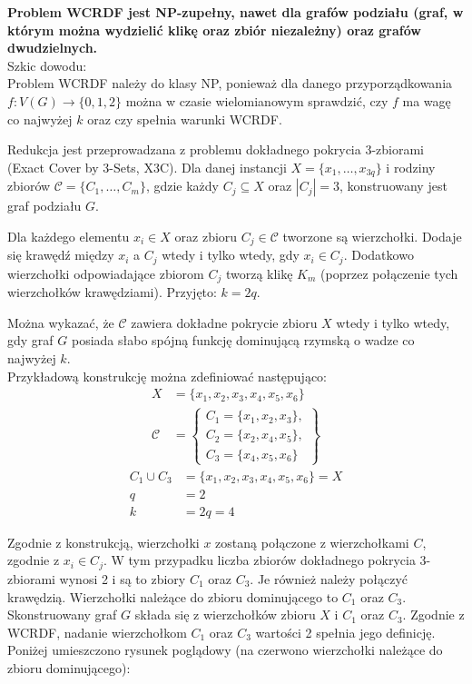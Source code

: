 \textbf{Problem WCRDF jest NP-zupełny, nawet dla grafów podziału (graf, w którym można wydzielić klikę oraz zbiór niezależny) oraz grafów dwudzielnych.}\\

Szkic dowodu:\\
Problem WCRDF należy do klasy NP, ponieważ dla danego przyporządkowania $f : V(G) \rightarrow \{0, 1, 2\}$ można w czasie wielomianowym sprawdzić, czy $f$ ma wagę co najwyżej $k$ oraz czy spełnia warunki WCRDF.

Redukcja jest przeprowadzana z problemu dokładnego pokrycia 3-zbiorami (Exact Cover by 3-Sets, X3C). Dla danej instancji $X = \{x_1, \dots, x_{3q}\}$ i rodziny zbiorów $\mathcal{C} = \{C_1, \dots, C_m\}$, gdzie każdy $C_j \subseteq X$ oraz $|C_j| = 3$, konstruowany jest graf podziału $G$.

Dla każdego elementu $x_i \in X$ oraz zbioru $C_j \in \mathcal{C}$ tworzone są wierzchołki. Dodaje się krawędź między $x_i$ a $C_j$ wtedy i tylko wtedy, gdy $x_i \in C_j$. Dodatkowo wierzchołki odpowiadające zbiorom $C_j$ tworzą klikę $K_m$ (poprzez połączenie tych wierzchołków krawędziami). Przyjęto: $k = 2q$.

Można wykazać, że $\mathcal{C}$ zawiera dokładne pokrycie zbioru $X$ wtedy i tylko wtedy, gdy graf $G$ posiada słabo spójną funkcję dominującą rzymską o wadze co najwyżej $k$.\\

Przykładową konstrukcję można zdefiniować następująco:
\begin{align*}
X &= \{x_1, x_2, x_3, x_4, x_5, x_6\} \\
\mathcal{C} &= \left\{
\begin{array}{l}
C_1 = \{x_1, x_2, x_3\}, \\
C_2 = \{x_2, x_4, x_5\}, \\
C_3 = \{x_4, x_5, x_6\}
\end{array}
\right\}
\end{align*}
\begin{align*}
C_1 \cup C_3 &= \{x_1, x_2, x_3, x_4, x_5, x_6\} = X \\
q &= 2 \\
k &= 2q = 4
\end{align*}

Zgodnie z konstrukcją, wierzchołki $x$ zostaną połączone z wierzchołkami $C$, zgodnie z  $x_i \in C_j$. W tym przypadku liczba zbiorów dokładnego pokrycia 3-zbiorami wynosi 2 i są to zbiory $C_1$ oraz $C_3$. Je również należy połączyć krawędzią. Wierzchołki należące do zbioru dominującego to $C_1$ oraz $C_3$. Skonstruowany graf $G$ składa się z wierzchołków zbioru $X$ i $C_1$ oraz $C_3$. Zgodnie z WCRDF, nadanie wierzchołkom $C_1$ oraz $C_3$ wartości 2 spełnia jego definicję. \\
Poniżej umieszczono rysunek poglądowy (na czerwono wierzchołki należące do zbioru dominującego):

